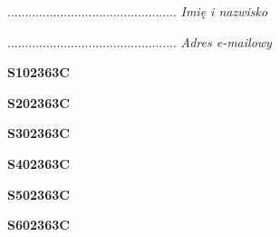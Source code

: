 \begin{turn}{90}\begin{minipage}{\linewidth} \vspace{20mm} ................................................  \textit{Imię i nazwisko}\end{minipage}\end{turn}

\begin{turn}{90}\begin{minipage}{\linewidth} \vspace{20mm} ................................................  \textit{Adres e-mailowy}\end{minipage}\end{turn}

\begin{turn}{90}\huge \begin{minipage}{\linewidth} \vspace{10mm}\textbf{S102363C}\end{minipage}\end{turn}

\begin{turn}{90}\huge \begin{minipage}{\linewidth} \vspace{10mm}\textbf{S202363C}\end{minipage}\end{turn}

\begin{turn}{90}\huge \begin{minipage}{\linewidth} \vspace{10mm}\textbf{S302363C}\end{minipage}\end{turn}

\begin{turn}{90}\huge \begin{minipage}{\linewidth} \vspace{10mm}\textbf{S402363C}\end{minipage}\end{turn}

\begin{turn}{90}\huge \begin{minipage}{\linewidth} \vspace{10mm}\textbf{S502363C}\end{minipage}\end{turn}

\begin{turn}{90}\huge \begin{minipage}{\linewidth} \vspace{10mm}\textbf{S602363C}\end{minipage}\end{turn}

